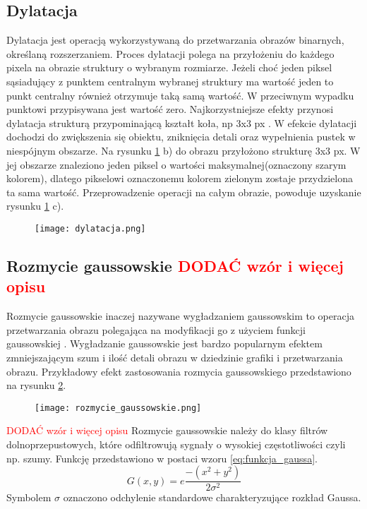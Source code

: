 \subsection{Dylatacja}
Dylatacja jest operacją wykorzystywaną do przetwarzania obrazów binarnych, określaną rozszerzaniem. Proces dylatacji polega na przyłożeniu do każdego pixela na obrazie struktury o wybranym rozmiarze. Jeżeli choć jeden piksel sąsiadujący z punktem centralnym wybranej struktury ma wartość jeden to punkt centralny również otrzymuje taką samą wartość. W przeciwnym wypadku punktowi przypisywana jest wartość zero. Najkorzystniejsze efekty przynosi dylatacja strukturą przypominającą kształt koła, np 3x3 px  \cite{image_proc}. W efekcie dylatacji dochodzi do zwiększenia się obiektu, zniknięcia detali oraz wypełnienia pustek w niespójnym obszarze. Na rysunku \ref{fig:dylatacja} b) do obrazu przyłożono strukturę 3x3 px. W jej obszarze znaleziono jeden piksel o wartości maksymalnej(oznaczony szarym kolorem), dlatego pikselowi oznaczonemu kolorem zielonym zostaje przydzielona ta sama wartość. Przeprowadzenie operacji na całym obrazie, powoduje uzyskanie rysunku \ref{fig:dylatacja} c).
\begin{figure}[H]
	\centering
	\texttt{[image: dylatacja.png]}
	\label{fig:dylatacja}
\end{figure}

\subsection{Rozmycie gaussowskie \textcolor{red}{DODAĆ wzór i więcej opisu}}
Rozmycie gaussowskie inaczej nazywane wygładzaniem gaussowskim to operacja przetwarzania obrazu polegająca na modyfikacji go z użyciem funkcji gaussowskiej  \cite{image_proc}. Wygładzanie gaussowskie jest bardzo popularnym efektem zmniejszającym szum i ilość detali obrazu w dziedzinie grafiki i przetwarzania obrazu. Przykładowy efekt zastosowania rozmycia gaussowskiego przedstawiono na rysunku \ref{fig:rozmycie_gaussowskie}.
\begin{figure}[H]
	\centering
	\texttt{[image: rozmycie\_gaussowskie.png]}
	\label{fig:rozmycie_gaussowskie}
\end{figure}
\textcolor{red}{DODAĆ wzór i więcej opisu}
Rozmycie gaussowskie należy do klasy filtrów dolnoprzepustowych, które odfiltrowują sygnały o wysokiej częstotliwości czyli np. szumy.
Funkcję \cite{gauss1} przedstawiono w postaci wzoru \ref{eq:funkcja_gaussa}.
\begin{equation} \label{eq:funkcja_gaussa}
G(x,y) = e \frac{-(x^{2}+y^{2})}{2\sigma^{2}}
\end{equation}
Symbolem $\sigma$ oznaczono odchylenie standardowe charakteryzujące rozkład Gaussa.
